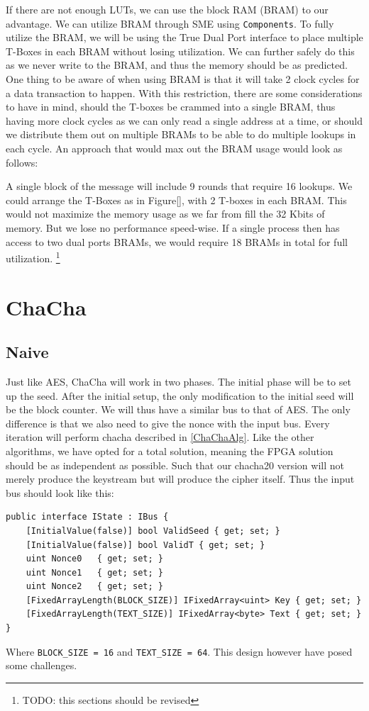 \documentclass[a4paper, openany]{book}
\begin{document}
If there are not enough LUTs, we can use the block RAM (BRAM) to our advantage. We can utilize BRAM through SME using \texttt{Components}. To fully utilize the BRAM, we will be using the True Dual Port interface to place multiple T-Boxes in each BRAM without losing utilization. We can further safely do this as we never write to the BRAM, and thus the memory should be as predicted. One thing to be aware of when using BRAM is that it will take 2 clock cycles for a data transaction to happen. With this restriction, there are some considerations to have in mind, should the T-boxes be crammed into a single BRAM, thus having more clock cycles as we can only read a single address at a time, or should we distribute them out on multiple BRAMs to be able to do multiple lookups in each cycle. An approach that would max out the BRAM usage would look as follows:

A single block of the message will include 9 rounds that require 16 lookups. We could arrange the T-Boxes as in Figure\ref{}, with 2 T-boxes in each BRAM. This would not maximize the memory usage as we far from fill the 32 Kbits of memory. But we lose no performance speed-wise. If a single process then has access to two dual ports BRAMs, we would require 18 BRAMs in total for full utilization. \footnote{TODO: this sections should be revised}
\section{ChaCha}
\label{sec:org318fe5b}

\subsection{Naive}
\label{ChaChaNaive}
Just like AES, ChaCha will work in two phases. The initial phase will be to set up the seed. After the initial setup, the only modification to the initial seed will be the block counter. We will thus have a similar bus to that of AES. The only difference is that we also need to give the nonce with the input bus. Every iteration will perform chacha described in \ref{ChaChaAlg}. Like the other algorithms, we have opted for a total solution, meaning the FPGA solution should be as independent as possible. Such that our chacha20 version will not merely produce the keystream but will produce the cipher itself. Thus the input bus should look like this:
\begin{verbatim}
public interface IState : IBus {
    [InitialValue(false)] bool ValidSeed { get; set; }
    [InitialValue(false)] bool ValidT { get; set; }
    uint Nonce0   { get; set; }
    uint Nonce1   { get; set; }
    uint Nonce2   { get; set; }
    [FixedArrayLength(BLOCK_SIZE)] IFixedArray<uint> Key { get; set; }
    [FixedArrayLength(TEXT_SIZE)] IFixedArray<byte> Text { get; set; }
}
\end{verbatim}
Where \texttt{BLOCK\_SIZE = 16} and \texttt{TEXT\_SIZE = 64}. This design however have posed some challenges.
\end{document}
